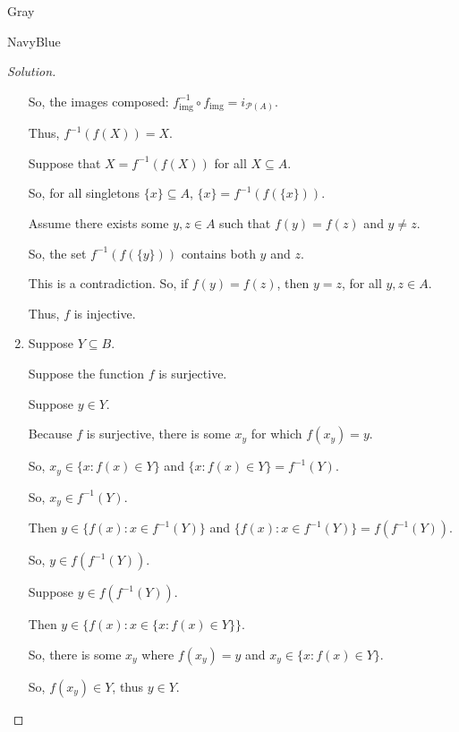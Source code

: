 \documentclass[12pt]{amsart}
\theoremstyle{named}
\newenvironment{soln}
{\begin{color}{Gray}\begin{framed}\begin{color}{NavyBlue}\begin{proof}[Solution]
\doublespacing}
{\end{proof}\end{color}\end{framed}\end{color}}
\theoremstyle{definition}
\begin{document}
\begin{soln}
\begin{enumerate}
        \noindent So, the images composed: $f^{-1}_\text{img} \circ f_\text{img} = i_{\mathscr P(A)}$.
        
        \noindent Thus, $f^{-1}(f(X)) = X$.

        \phantom{ }

        \noindent Suppose that $X = f^{-1}(f(X))$ for all $X \subseteq A$.

        \noindent So, for all singletons $\{x\} \subseteq A$, $\{x\} = f^{-1}(f(\{x\}))$.

        \noindent Assume there exists some $y,z \in A$ such that $f(y) = f(z)$ and $y \neq z$. 

        \noindent So, the set $f^{-1}(f(\{y\}))$ contains both $y$ and $z$. 

        \noindent This is a contradiction. So, if $f(y) = f(z)$, then $y = z$, for all $y,z \in A$.

        \noindent Thus, $f$ is injective.     

        \item
        \phantom{ }
        
        \noindent Suppose $Y \subseteq B$.

        \noindent Suppose the function $f$ is surjective. 

        \begin{adjustwidth}{2em}{0em}
            \noindent Suppose $y \in Y$.

            \noindent Because $f$ is surjective, there is some $x_y$ for which $f(x_y) = y$.
    
            \noindent So, $x_y \in \{x : f(x) \in Y\}$ and $\{x : f(x) \in Y\} = f^{-1}(Y)$.
    
            \noindent So, $x_y \in f^{-1}(Y)$. 
    
            \noindent Then $y \in \{f(x) : x \in f^{-1}(Y)\}$ and $\{f(x) : x \in f^{-1}(Y)\} = f(f^{-1}(Y))$.
    
            \noindent So, $y \in f(f^{-1}(Y))$.

            \phantom{ }

            \noindent Suppose $y \in f(f^{-1}(Y))$. 

            \noindent Then $y \in \{f(x) : x \in \{x : f(x) \in Y\}\}$.

            \noindent So, there is some $x_y$ where $f(x_y) = y$ and $x_y \in \{x : f(x) \in Y\}$. 

            \noindent So, $f(x_y) \in Y$, thus $y \in Y$. 
        \end{adjustwidth}


\end{enumerate}
\end{soln}
\end{document}
